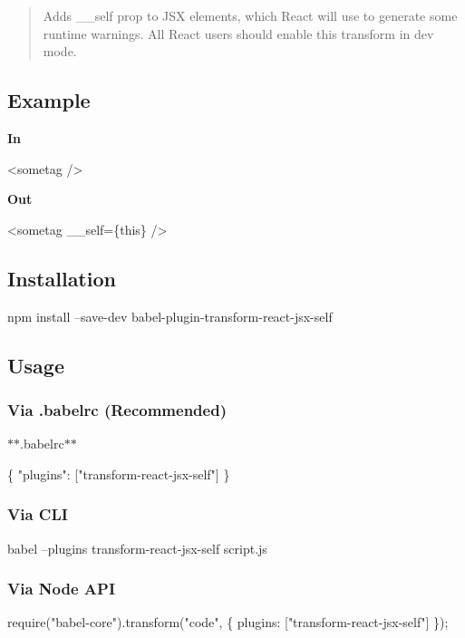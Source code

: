 \begin{quote}
Adds {\ttfamily \+\_\+\+\_\+self} prop to J\+SX elements, which React will use to generate some runtime warnings. All React users should enable this transform in dev mode. \end{quote}


\subsection*{Example}

{\bfseries In}


\begin{DoxyCode}
<sometag />
\end{DoxyCode}


{\bfseries Out}


\begin{DoxyCode}
<sometag \_\_self=\{this\} />
\end{DoxyCode}


\subsection*{Installation}


\begin{DoxyCode}
npm install --save-dev babel-plugin-transform-react-jsx-self
\end{DoxyCode}


\subsection*{Usage}

\subsubsection*{Via {\ttfamily .babelrc} (Recommended)}

$\ast$$\ast$.babelrc$\ast$$\ast$


\begin{DoxyCode}
\{
  "plugins": ["transform-react-jsx-self"]
\}
\end{DoxyCode}


\subsubsection*{Via C\+LI}


\begin{DoxyCode}
babel --plugins transform-react-jsx-self script.js
\end{DoxyCode}


\subsubsection*{Via Node A\+PI}


\begin{DoxyCode}
require("babel-core").transform("code", \{
  plugins: ["transform-react-jsx-self"]
\});
\end{DoxyCode}
 